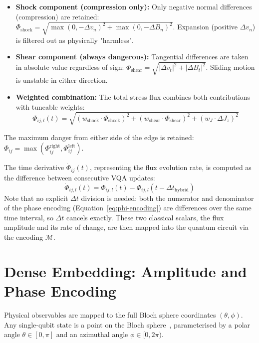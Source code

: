 \documentclass[12pt, a4paper, oneside]{report}
\begin{document}
\begin{itemize}
    \item \textbf{Shock component (compression only):} Only negative normal differences (compression) are retained: $\Phi_{\text{shock}} = \sqrt{\max(0, -\Delta v_n)^2 + \max(0, -\Delta B_n)^2}$. Expansion (positive $\Delta v_n$) is filtered out as physically "harmless".
    \item \textbf{Shear component (always dangerous):} Tangential differences are taken in absolute value regardless of sign: $\Phi_{\text{shear}} = \sqrt{|\Delta v_t|^2 + |\Delta B_t|^2}$. Sliding motion is unstable in either direction.
    \item \textbf{Weighted combination:} The total stress flux combines both contributions with tuneable weights:
    \begin{equation}
        \Phi_{ij,l}(t) = \sqrt{(w_{\text{shock}} \cdot \Phi_{\text{shock}})^2 + (w_{\text{shear}} \cdot \Phi_{\text{shear}})^2 + (w_J \cdot \Delta J_z)^2}
    \end{equation}
\end{itemize}

The maximum danger from either side of the edge is retained: $\Phi_{ij} = \max(\Phi_{ij}^{\text{right}}, \Phi_{ij}^{\text{left}})$.

The time derivative $\dot{\Phi}_{ij}(t)$, representing the flux evolution rate, is computed as the difference between consecutive VQA updates:
\begin{equation}
    \dot{\Phi}_{ij, l}(t) = \Phi_{ij, l}(t) - \Phi_{ij, l}(t - \Delta t_{\text{hybrid}})
\end{equation}
Note that no explicit $\Delta t$ division is needed: both the numerator and denominator of the phase encoding (Equation~\ref{eq:phi-encoding}) are differences over the same time interval, so $\Delta t$ cancels exactly. These two classical scalars, the flux amplitude and its rate of change, are then mapped into the quantum circuit via the encoding $\mathcal{M}$.


\section{Dense Embedding: Amplitude and Phase Encoding}
\label{sec:dense-embedding}

Physical observables are mapped to the full Bloch sphere coordinates $(\theta, \phi)$. Any single-qubit state is a point on the Bloch sphere~\cite{nielsen2010}, parameterised by a polar angle $\theta \in [0, \pi]$ and an azimuthal angle $\phi \in [0, 2\pi)$.
\end{document}
